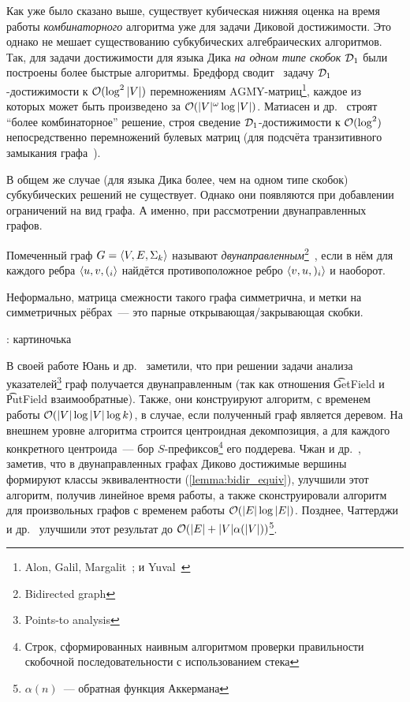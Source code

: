 Как уже было сказано выше, существует кубическая нижняя оценка на время работы \textit{комбинаторного} алгоритма уже для задачи Диковой достижимости. Это однако не мешает существованию субкубических алгебраических алгоритмов. Так, для задачи достижимости для языка Дика \textit{на одном типе скобок} $\mathcal{D}_1$ были построены более быстрые алгоритмы. Бредфорд сводит~\cite{Bradford17} задачу $\mathcal{D}_1$-достижимости к $\mathcal{O}(\log^2 |V|)$ перемножениям AGMY-матриц\footnote{Alon, Galil, Margalit~\cite{Alon1997}; и Yuval~\cite{Yuval1976}}, каждое из которых может быть произведено за $\mathcal{O}(|V|^{\omega} \log |V|)$. Матиасен и др.~\cite{Mathiasen21} строят ``более комбинаторное'' решение, строя сведение $\mathcal{D}_1$-достижимости к $\mathcal{O}(\log^2)$ непосредственно перемножений булевых матриц (для подсчёта транзитивного замыкания графа~\cite{Aho1974}).

В общем же случае (для языка Дика более, чем на одном типе скобок) субкубических решений не существует. Однако они появляются при добавлении ограничений на вид графа. А именно, при рассмотрении двунаправленных графов. 

\begin{definition}
  Помеченный граф $G = \langle V, E, \Sigma_k \rangle$ называют \textit{двунаправленным}\footnote{Bidirected graph}~\cite{Yuan09}, если в нём для каждого ребра $\langle u, v, (_i \rangle$ найдётся противоположное ребро $\langle v, u, )_i \rangle$ и наоборот.

  Неформально, матрица смежности такого графа симметрична, и метки на симметричных рёбрах~--- это парные открывающая/закрывающая скобки.
\end{definition}

\TODO: картиночька

В своей работе Юань и др.~\cite{Yuan09} заметили, что при решении задачи анализа указателей\footnote{Points-to analysis} граф получается двунаправленным (так как отношения \t{GetField} и \t{PutField} взаимообратные). Также, они конструируют алгоритм, с временем работы $\mathcal{O}(|V| \log |V| \log k)$, в случае, если полученный граф является деревом. На внешнем уровне алгоритма строится центроидная декомпозиция, а для каждого конкретного центроида~--- бор $S$-префиксов\footnote{Строк, сформированных наивным алгоритмом проверки правильности скобочной последовательности с использованием стека} его поддерева. Чжан и др.~\cite{Zhang13}, заметив, что в двунаправленных графах Диково достижимые вершины формируют классы эквивалентности (\ref{lemma:bidir_equiv}), улучшили этот алгоритм, получив линейное время работы, а также сконструировали алгоритм для произвольных графов с временем работы $\mathcal{O}(|E| \log |E|)$. Позднее, Чаттерджи и др.~\cite{Chatterjee17} улучшили этот результат до $\mathcal{O}(|E| + |V| \alpha(|V|))$\footnote{$\alpha(n)$~--- обратная функция Аккермана}.

